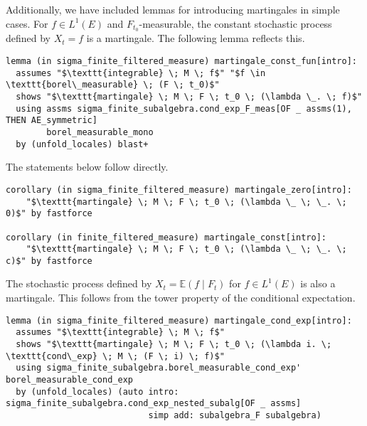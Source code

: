 Additionally, we have included lemmas for introducing martingales in simple cases. For $f \in L^1(E)$ and $F_{t_0}$-measurable, the constant stochastic process defined by $X_t = f$ is a martingale. The following lemma reflects this.

\begin{isalemma}
{\small
\begin{lstlisting}[style=isabelle]
lemma (in sigma_finite_filtered_measure) martingale_const_fun[intro]:  
  assumes "$\texttt{integrable} \; M \; f$" "$f \in \texttt{borel\_measurable} \; (F \; t_0)$"
  shows "$\texttt{martingale} \; M \; F \; t_0 \; (\lambda \_. \; f)$"
  using assms sigma_finite_subalgebra.cond_exp_F_meas[OF _ assms(1), THEN AE_symmetric] 
  		borel_measurable_mono
  by (unfold_locales) blast+
\end{lstlisting}
}
\end{isalemma}

The statements below follow directly.

\begin{isacorollary}
{\small
\begin{lstlisting}[style=isabelle]
corollary (in sigma_finite_filtered_measure) martingale_zero[intro]: 
	"$\texttt{martingale} \; M \; F \; t_0 \; (\lambda \_ \; \_. \; 0)$" by fastforce

corollary (in finite_filtered_measure) martingale_const[intro]: 
	"$\texttt{martingale} \; M \; F \; t_0 \; (\lambda \_ \; \_. \; c)$" by fastforce
\end{lstlisting}
}
\end{isacorollary}

The stochastic process defined by $X_t = \mathbb{E}(f \;\vert\; F_t)$ for $f \in L^1(E)$ is also a martingale. This follows from the tower property of the conditional expectation.

\begin{isalemma}
{\small
\begin{lstlisting}[style=isabelle]
lemma (in sigma_finite_filtered_measure) martingale_cond_exp[intro]:  
  assumes "$\texttt{integrable} \; M \; f$"
  shows "$\texttt{martingale} \; M \; F \; t_0 \; (\lambda i. \; \texttt{cond\_exp} \; M \; (F \; i) \; f)$"
  using sigma_finite_subalgebra.borel_measurable_cond_exp' borel_measurable_cond_exp 
  by (unfold_locales) (auto intro: sigma_finite_subalgebra.cond_exp_nested_subalg[OF _ assms] 
  							simp add: subalgebra_F subalgebra)
\end{lstlisting}
}
\end{isalemma}

